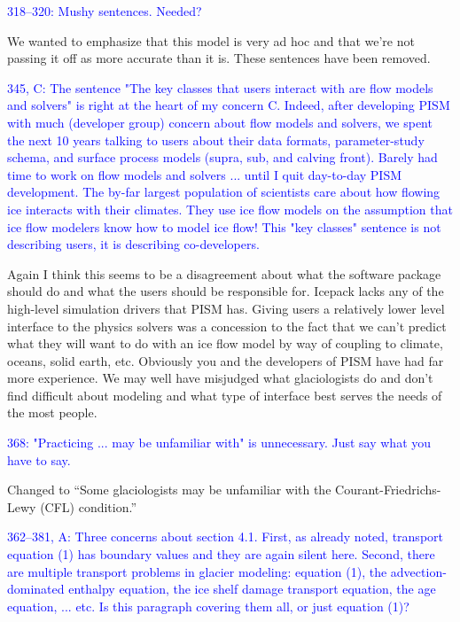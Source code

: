 \documentclass{article}
\theoremstyle{definition}
\theoremstyle{plain}
\begin{document}
\textcolor{blue}{318--320:  Mushy sentences.  Needed?}

We wanted to emphasize that this model is very ad hoc and that we're not passing it off as more accurate than it is.
These sentences have been removed.

\textcolor{blue}{345, C:  The sentence "The key classes that users interact with are flow models and solvers" is right at the heart of my concern C.  Indeed, after developing PISM with much (developer group) concern about flow models and solvers, we spent the next 10 years talking to users about their data formats, parameter-study schema, and surface process models (supra, sub, and calving front).  Barely had time to work on flow models and solvers ... until I quit day-to-day PISM development.  The by-far largest population of scientists care about how flowing ice interacts with their climates.  They use ice flow models on the assumption that ice flow modelers know how to model ice flow!  This "key classes" sentence is not describing users, it is describing co-developers.}

Again I think this seems to be a disagreement about what the software package should do and what the users should be responsible for.
Icepack lacks any of the high-level simulation drivers that PISM has.
Giving users a relatively lower level interface to the physics solvers was a concession to the fact that we can't predict what they will want to do with an ice flow model by way of coupling to climate, oceans, solid earth, etc.
Obviously you and the developers of PISM have had far more experience.
We may well have misjudged what glaciologists do and don't find difficult about modeling and what type of interface best serves the needs of the most people.

\textcolor{blue}{368:  "Practicing ... may be unfamiliar with" is unnecessary.  Just say what you have to say.}

Changed to ``Some glaciologists may be unfamiliar with the Courant-Friedrichs-Lewy (CFL) condition.''

\textcolor{blue}{362--381, A:  Three concerns about section 4.1.  First, as already noted, transport equation (1) has boundary values and they are again silent here.  Second, there are multiple transport problems in glacier modeling: equation (1), the advection-dominated enthalpy equation, the ice shelf damage transport equation, the age equation, ... etc.  Is this paragraph covering them all, or just equation (1)?}
\end{document}
